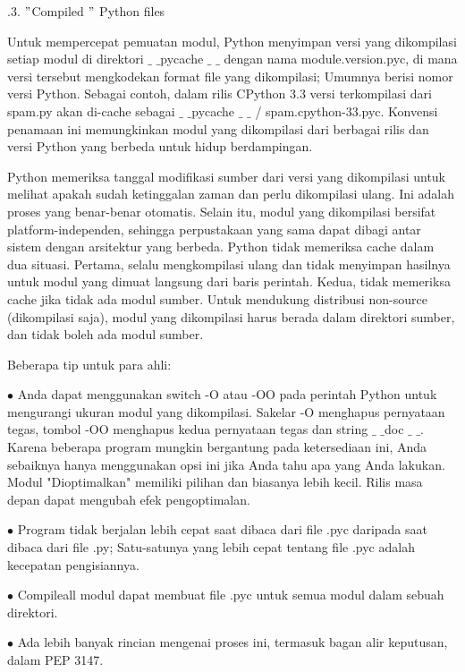 \vspace{12pt}
\vspace{12pt}
.3.  $ " $Compiled $ " $ Python files \par
\noindent 
Untuk mempercepat pemuatan modul, Python menyimpan versi yang dikompilasi setiap modul di direktori  $  \_  $ $  \_  $pycache $  \_  $ $  \_  $ dengan nama module.version.pyc, di mana versi tersebut mengkodekan format file yang dikompilasi; Umumnya berisi nomor versi Python. Sebagai contoh, dalam rilis CPython 3.3 versi terkompilasi dari spam.py akan di-cache sebagai  $  \_  $ $  \_  $pycache  $  \_  $ $  \_  $ / spam.cpython-33.pyc. Konvensi penamaan ini memungkinkan modul yang dikompilasi dari berbagai rilis dan versi Python yang berbeda untuk hidup berdampingan.  \par
\vspace{12pt}
\noindent 
Python memeriksa tanggal modifikasi sumber dari versi yang dikompilasi untuk melihat apakah sudah ketinggalan zaman dan perlu dikompilasi ulang. Ini adalah proses yang benar-benar otomatis. Selain itu, modul yang dikompilasi bersifat platform-independen, sehingga perpustakaan yang sama dapat dibagi antar sistem dengan arsitektur yang berbeda. Python tidak memeriksa cache dalam dua situasi. Pertama, selalu mengkompilasi ulang dan tidak menyimpan hasilnya untuk modul yang dimuat langsung dari baris perintah. Kedua, tidak memeriksa cache jika tidak ada modul sumber. Untuk mendukung distribusi non-source (dikompilasi saja), modul yang dikompilasi harus berada dalam direktori sumber, dan tidak boleh ada modul sumber. \par
\vspace{12pt}
\vspace{12pt}
\vspace{12pt}
\vspace{12pt}
\vspace{12pt}
\vspace{12pt}
\noindent 
Beberapa tip untuk para ahli: \par
\noindent 
 $ \bullet $ Anda dapat menggunakan switch -O atau -OO pada perintah Python untuk mengurangi ukuran modul yang dikompilasi. Sakelar -O menghapus pernyataan tegas, tombol -OO menghapus kedua pernyataan tegas dan string  $  \_  $ $  \_  $doc $  \_  $ $  \_  $. Karena beberapa program mungkin bergantung pada ketersediaan ini, Anda sebaiknya hanya menggunakan opsi ini jika Anda tahu apa yang Anda lakukan. Modul "Dioptimalkan" memiliki pilihan dan biasanya lebih kecil. Rilis masa depan dapat mengubah efek pengoptimalan. \par
\noindent 
 $ \bullet $ Program tidak berjalan lebih cepat saat dibaca dari file .pyc daripada saat dibaca dari file .py; Satu-satunya yang lebih cepat tentang file .pyc adalah kecepatan pengisiannya. \par
\noindent 
 $ \bullet $ Compileall modul dapat membuat file .pyc untuk semua modul dalam sebuah direktori. \par
\noindent 
 $ \bullet $ Ada lebih banyak rincian mengenai proses ini, termasuk bagan alir keputusan, dalam PEP 3147. \par

